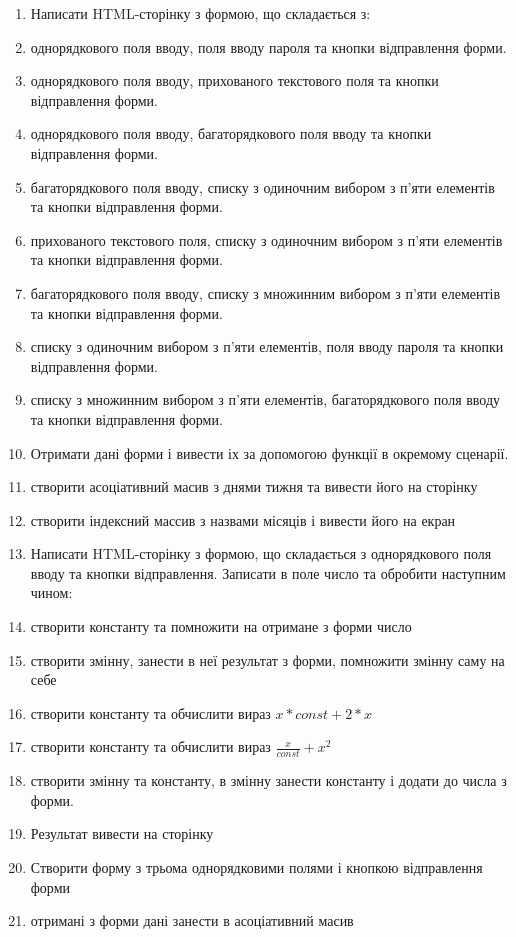 \begin{enumerate}
\item[]Написати HTML-сторінку з формою, що складається з:
\item однорядкового поля вводу, поля вводу пароля та кнопки відправлення форми.
\item однорядкового поля вводу, прихованого текстового поля та кнопки відправлення форми.
\item однорядкового поля вводу, багаторядкового поля вводу та кнопки відправлення форми.
\item багаторядкового поля вводу, списку з одиночним вибором з п'яти елементів та кнопки відправлення форми.
\item прихованого текстового поля, списку з одиночним вибором з п'яти елементів та кнопки відправлення форми.
\item багаторядкового поля вводу, списку з множинним вибором з п'яти елементів та кнопки відправлення форми.
\item списку з одиночним вибором з п'яти елементів, поля вводу пароля та кнопки відправлення форми.
\item списку з множинним вибором з п'яти елементів, багаторядкового поля вводу та кнопки відправлення форми.
\item[]Отримати дані форми і вивести іх за допомогою функції в окремому сценарії.
\item створити асоціативний масив з днями тижня та вивести його на сторінку
\item створити індексний массив з назвами місяців і вивести його на екран
\item[]Написати HTML-сторінку з формою, що складається з однорядкового поля вводу та кнопки відправлення. Записати в поле число та обробити наступним чином:
\item створити константу та помножити на отримане з форми число 
\item створити змінну, занести в неї результат з форми, помножити змінну саму на себе
\item створити константу та обчислити вираз $x*const+2*x$
\item створити константу та обчислити вираз $\frac{x}{const}+x^2$
\item створити змінну та константу, в змінну занести константу і додати до числа з форми.
\item[]Результат вивести на сторінку 
\item[]Створити форму з трьома однорядковими полями і кнопкою відправлення форми
\item отримані з форми дані занести в асоціативний масив

\end{enumerate}

